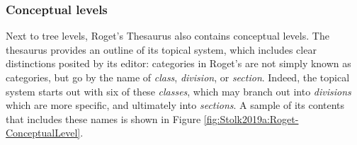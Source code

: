 
%
%
%

%	


\subsubsection{Conceptual levels}

Next to tree levels, Roget's Thesaurus also contains conceptual levels. 
The thesaurus provides an outline of its topical system, which includes clear distinctions posited by its editor: 
categories in Roget's are not simply known as categories, but go by the name of \emph{class}, \emph{division}, or \emph{section}. 
Indeed, the topical system starts out with six of these \emph{classes}, which may branch out into \emph{divisions} which are more specific, and ultimately into \emph{sections}. 
A sample of its contents that includes these names is shown in Figure \ref{fig:Stolk2019a:Roget-ConceptualLevel}.

